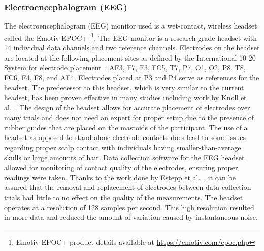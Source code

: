 \documentclass[11pt]{article}
\begin{document}
		\subsubsection{Electroencephalogram (EEG)}
		The electroencephalogram (EEG) monitor used is a wet-contact, wireless headset called the Emotiv EPOC+~\footnote{Emotiv EPOC+ product details available at \url{https://emotiv.com/epoc.php}}. The EEG monitor is a research grade headset with 14 individual data channels and two reference channels. Electrodes on the headset are located at the following placement sites as defined by the International 10-20 System for electrode placement~\cite{Jasper}: AF3, F7, F3, FC5, T7, P7, O1, O2, P8, T8, FC6, F4, F8, and AF4. Electrodes placed at P3 and P4 serve as references for the headset. The predecessor to this headset, which is very similar to the current headset, has been proven effective in many studies including work by Knoll et al.~\cite{Knoll}. The design of the headset allows for accurate placement of electrodes over many trials and does not need an expert for proper setup due to the presence of rubber guides that are placed on the mastoids of the participant. The use of a headset as opposed to stand-alone electrode contacts does lead to some issues regarding proper scalp contact with individuals having smaller-than-average skulls or large amounts of hair. Data collection software for the EEG headset allowed for monitoring of contact quality of the electrodes, ensuring proper readings were taken. Thanks to the work done by Estepp et al.~\cite{Estepp_2015}, it can be assured that the removal and replacement of electrodes between data collection trials had little to no effect on the quality of the measurements. The headset operates at a resolution of 128 samples per second. This high resolution resulted in more data and reduced the amount of variation caused by instantaneous noise.
			
\end{document}
